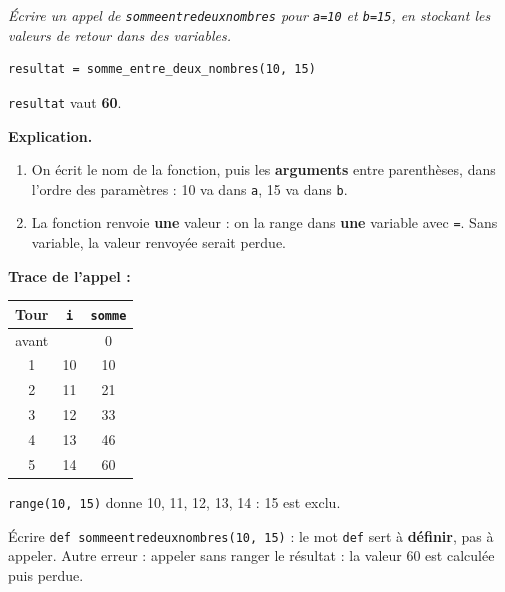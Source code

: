 \documentclass[addpoints, 11pt]{exam}
\newcommand{\enonce}[1]{\textit{#1}\par\smallskip}
\newcommand{\explication}{\par\smallskip\noindent\textbf{Explication.}\ }
\newcommand{\code}[1]{\texttt{#1}}
\DeclareRobustCommand{\_}{\textunderscore\allowbreak}
\begin{document}
\begin{questions}
\question[1] \enonce{Écrire un appel de \code{somme\_entre\_deux\_nombres} pour \code{a=10} et \code{b=15}, en stockant les valeurs de retour dans des variables.}
\begin{reponse}
\begin{lstlisting}
resultat = somme_entre_deux_nombres(10, 15)
\end{lstlisting}
\code{resultat} vaut \textbf{60}.
\end{reponse}
\explication
\begin{enumerate}
  \item On écrit le nom de la fonction, puis les \textbf{arguments} entre parenthèses, dans l'ordre des paramètres : 10 va dans \code{a}, 15 va dans \code{b}.
  \item La fonction renvoie \textbf{une} valeur : on la range dans \textbf{une} variable avec \code{=}. Sans variable, la valeur renvoyée serait perdue.
\end{enumerate}
\textbf{Trace de l'appel :}
\begin{center}
\begin{tabular}{|c|c|c|}
\hline
Tour & \code{i} & \code{somme} \\ \hline
avant & & 0 \\
1 & 10 & 10 \\
2 & 11 & 21 \\
3 & 12 & 33 \\
4 & 13 & 46 \\
5 & 14 & 60 \\ \hline
\end{tabular}
\end{center}
\code{range(10, 15)} donne 10, 11, 12, 13, 14 : 15 est exclu.
\begin{erreur}
Écrire \code{def somme\_entre\_deux\_nombres(10, 15)} : le mot \code{def} sert à \textbf{définir}, pas à appeler. Autre erreur : appeler sans ranger le résultat : la valeur 60 est calculée puis perdue.
\end{erreur}


\end{questions}
\end{document}
